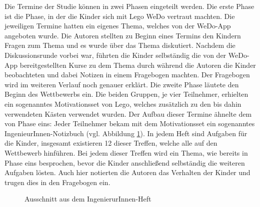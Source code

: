 	Die Termine der Studie können in zwei Phasen eingeteilt werden. Die erste Phase ist die Phase, in der die Kinder sich mit Lego WeDo vertraut machten. Die jeweiligen Termine hatten ein eigenes Thema, welches von der WeDo-App angeboten wurde. Die Autoren stellten zu Beginn eines Termins den Kindern Fragen zum Thema und es wurde über das Thema diskutiert. Nachdem die Diskussionsrunde vorbei war, führten die Kinder selbständig die von der WeDo-App bereitgestellten Kurse zu dem Thema durch während die Autoren die Kinder beobachteten und dabei Notizen in einem Fragebogen machten. Der Fragebogen wird im weiteren Verlauf noch genauer erklärt. Die zweite Phase läutete den Beginn des Wettbewerbs ein. Die beiden Gruppen, je vier Teilnehmer, erhielten ein sogenanntes Motivationsset von Lego, welches zusätzlich zu den bis dahin verwendeten Kästen verwendet wurden. Der Aufbau dieser Termine ähnelte dem von Phase eins: Jeder Teilnehmer bekam mit dem Motivationsset ein sogenanntes IngenieurInnen-Notizbuch (vgl. Abbildung \ref{img:explorer_heft}). In jedem Heft sind Aufgaben für die Kinder, insgesamt existieren 12 dieser Treffen, welche alle auf den Wettbewerb hinführen. Bei jedem dieser Treffen wird ein Thema, wie bereits in Phase eins besprochen, bevor die Kinder anschließend selbständig die weiteren Aufgaben lösten. Auch hier notierten die Autoren das Verhalten der Kinder und trugen dies in den Fragebogen ein. 
	\begin{figure}[htbp!]
		\centering
		\caption[Ausschnitt aus dem IngenierurInnen-Heft]{Ausschnitt aus dem IngenierurInnen-Heft}
		\label{img:explorer_heft}
	\end{figure}
	
